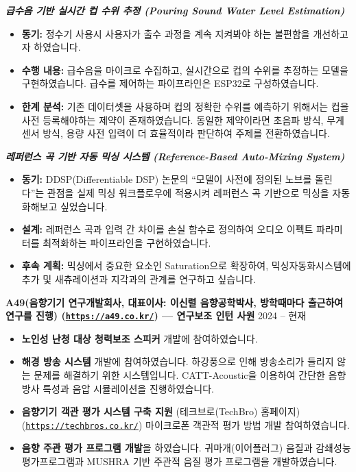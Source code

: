 \documentclass[letterpaper,12pt]{article}
\newcommand{\cventry}[2]{%
    \vspace{9pt}%
    \textbf{#1} \hfill #2\par\vspace{2pt}%
}
\newcommand{\cvsub}[1]{%
    \vspace{8pt}%
    \hspace*{10pt}\textbf{\textit{#1}}\par\vspace{2pt}%
}
\begin{document}
\cvsub{급수음 기반 실시간 컵 수위 추정 (Pouring Sound Water Level Estimation)}
\begin{itemize}
    \item \textbf{동기:} 정수기 사용시 사용자가 출수 과정을 계속 지켜봐야 하는 불편함을 개선하고자 하였습니다.
    \item \textbf{수행 내용:} 급수음을 마이크로 수집하고, 실시간으로 컵의 수위를 추정하는 모델을 구현하였습니다. 급수를 제어하는 파이프라인은 ESP32로 구성하였습니다.
    \item \textbf{한계 분석:} 기존 데이터셋을 사용하며 컵의 정확한 수위를 예측하기 위해서는 컵을 사전 등록해야하는 제약이 존재하였습니다. 동일한 제약이라면 초음파 방식, 무게 센서 방식, 용량 사전 입력이 더 효율적이라 판단하여 주제를 전환하였습니다.
\end{itemize}

\cvsub{레퍼런스 곡 기반 자동 믹싱 시스템 (Reference-Based Auto-Mixing System)}
\begin{itemize}
    \item \textbf{동기:} DDSP(Differentiable DSP) 논문의 ``모델이 사전에 정의된 노브를 돌린다''는 관점을 실제 믹싱 워크플로우에 적용시켜 레퍼런스 곡 기반으로 믹싱을 자동화해보고 싶었습니다.
    \item \textbf{설계:} 레퍼런스 곡과 입력 간 차이를 손실 함수로 정의하여 오디오 이펙트 파라미터를 최적화하는 파이프라인을 구현하였습니다.
    \item \textbf{후속 계획:} 믹싱에서 중요한 요소인 Saturation으로 확장하여, 믹싱자동화시스템에 추가 및 새츄레이션과 지각과의 관계를 연구하고 싶습니다.
\end{itemize}

\cventry{A49(음향기기 연구개발회사, 대표이사: 이신렬 음향공학박사, 방학때마다 출근하여 연구를 진행) (\href{https://a49.co.kr/}{\texttt{https://a49.co.kr/}}) --- 연구보조 인턴 사원}{2024 -- 현재}
\begin{itemize}
    \item \textbf{노인성 난청 대상 청력보조 스피커} 개발에 참여하였습니다.  
    \item \textbf{해경 방송 시스템} 개발에 참여하였습니다. 하강풍으로 인해 방송소리가 들리지 않는 문제를 해결하기 위한 시스템입니다. CATT-Acoustic을 이용하여 간단한 음향 방사 특성과 음압 시뮬레이션을 진행하였습니다.
    \item \textbf{음향기기 객관 평가 시스템 구축 지원} (테크브로(TechBro) 홈페이지)(\href{https://techbros.co.kr/}{\texttt{https://techbros.co.kr/}}) 마이크로폰 객관적 평가 방법 개발 참여하였습니다.
    \item \textbf{음향 주관 평가 프로그램 개발}을 하였습니다. 귀마개(이어플러그) 음질과 감쇄성능 평가프로그램과 MUSHRA 기반 주관적 음질 평가 프로그램을 개발하였습니다.
\end{itemize}
\end{document}
